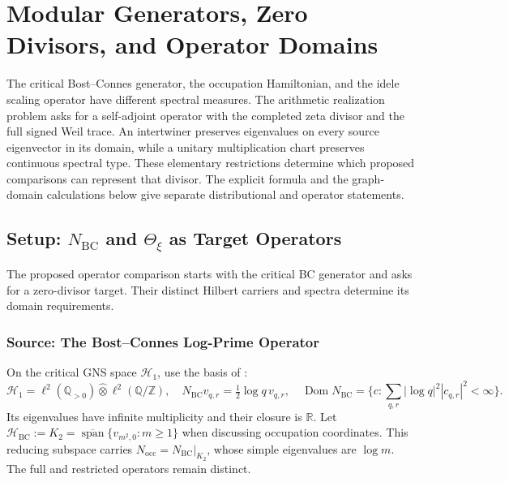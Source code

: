 \chapter{Modular Generators, Zero Divisors, and Operator Domains}
\label{v4-arith:w9-r4:hpar-spectral-flow}

The critical Bost--Connes generator, the occupation Hamiltonian,
and the idele scaling operator have different spectral measures.
The arithmetic realization problem asks for a self-adjoint operator
with the completed zeta divisor and the full signed Weil trace.
An intertwiner preserves eigenvalues on every source eigenvector
in its domain, while a unitary multiplication chart preserves
continuous spectral type. These elementary restrictions determine
which proposed comparisons can represent that divisor.
The explicit formula and the graph-domain calculations below give
separate distributional and operator statements.

\section{Setup: \(N_{\mathrm{BC}}\) and \(\Theta_{\xi}\) as Target Operators}
\label{v4-arith:w9-r4:setup}

The proposed operator comparison starts with the critical BC
generator and asks for a zero-divisor target. Their distinct
Hilbert carriers and spectra determine its domain requirements.

\subsection{Source: The Bost--Connes Log-Prime Operator}
\label{v4-arith:w9-r4:setup:source}

\begin{definition}
\label{v4-arith:w9-r4:def:bc-data}
On the critical GNS space \(\mathcal H_1\), use the basis of
:
\[
 \mathcal H_1=\ell^2(\mathbb Q_{>0})\widehat\otimes\ell^2(\mathbb Q/\mathbb Z),
 \quad N_{\mathrm{BC}}v_{q,r}=\tfrac12\log q\,v_{q,r},
 \quad\operatorname{Dom}N_{\mathrm{BC}}
 =\{c:\sum_{q,r}|\log q|^2|c_{q,r}|^2<\infty\}.
\]
Its eigenvalues have infinite multiplicity and their closure is
\(\mathbb R\). Let
\(\mathcal H_{\mathrm{BC}}:=K_2=\overline{\operatorname{span}}\{v_{m^2,0}:m\ge1\}\)
when discussing occupation coordinates. This reducing subspace
carries \(N_{\mathrm{occ}}=N_{\mathrm{BC}}|_{K_2}\), whose simple eigenvalues
are \(\log m\). The full and restricted operators remain distinct.
\end{definition}

